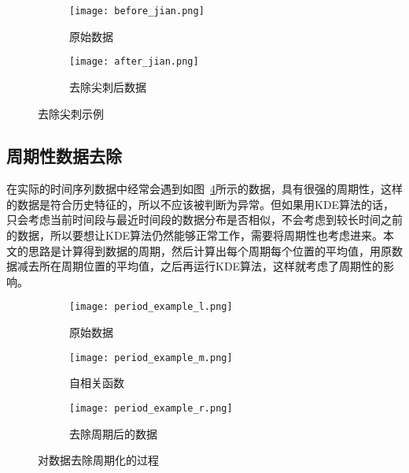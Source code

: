 \begin{figure}[htbp]
  \begin{subfigure}[b]{0.5\textwidth}
    \begin{minipage}[t]{\linewidth}
    \centering
    \texttt{[image: before\_jian.png]}
    \caption{原始数据}
    \label{fig:smooth:left}
    \end{minipage}
  \end{subfigure}
  \begin{subfigure}[b]{0.5\textwidth}
    \begin{minipage}[t]{\linewidth}
    \centering
    \texttt{[image: after\_jian.png]}
    \caption{去除尖刺后数据}
    \label{fig:smooth:right}
    \end{minipage}
  \end{subfigure}
    \caption{去除尖刺示例}
    \label{fig:smooth}
\end{figure}

\subsection{周期性数据去除}


在实际的时间序列数据中经常会遇到如图~\ref{fig:period:left}所示的数据，具有很强的周期性，这样的数据是符合历史特征的，所以不应该被判断为异常。但如果用KDE算法的话，只会考虑当前时间段与最近时间段的数据分布是否相似，不会考虑到较长时间之前的数据，所以要想让KDE算法仍然能够正常工作，需要将周期性也考虑进来。本文的思路是计算得到数据的周期，然后计算出每个周期每个位置的平均值，用原数据减去所在周期位置的平均值，之后再运行KDE算法，这样就考虑了周期性的影响。
\begin{figure}[htbp]
  \begin{subfigure}[b]{0.335\textwidth}
    \begin{minipage}[t]{\linewidth}
    \centering
    \texttt{[image: period\_example\_l.png]}
    \caption{原始数据}
    \label{fig:period:left}
    \end{minipage}
  \end{subfigure}
  \begin{subfigure}[b]{0.325\textwidth}
    \begin{minipage}[t]{\linewidth}
    \centering
    \texttt{[image: period\_example\_m.png]}
    \caption{自相关函数}
    \label{fig:period:middle}
    \end{minipage}
  \end{subfigure}
  \begin{subfigure}[b]{0.325\textwidth}
    \begin{minipage}[t]{\linewidth}
      \centering
      \texttt{[image: period\_example\_r.png]}
      \caption{去除周期后的数据}
      \label{fig:period:right}
      \end{minipage}
    \end{subfigure}
    \caption{对数据去除周期化的过程}
    \label{fig:period}
\end{figure}

